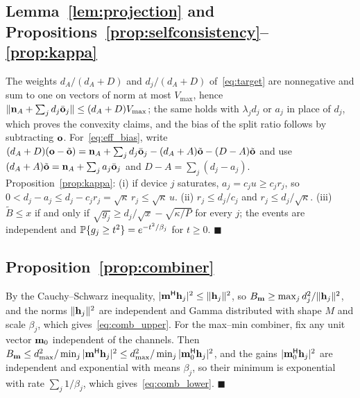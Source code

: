 \subsection{Lemma~\ref{lem:projection} and Propositions~\ref{prop:selfconsistency}--\ref{prop:kappa}}
The weights $d_A/(d_A+D)$ and $d_j/(d_A+D)$ of~\eqref{eq:target} are nonnegative and sum to one on vectors of norm at most $V_{\max}$, hence $\|\mathbf{n}_A+\sum_jd_j\bar{\mathbf{o}}_j\|\le(d_A+D)V_{\max}$; the same holds with $\lambda_jd_j$ or $a_j$ in place of $d_j$, which proves the convexity claims, and the bias of the split ratio follows by subtracting $\mathbf{o}$. For~\eqref{eq:eff_bias}, write $(d_A+D)(\mathbf{o}-\tilde{\mathbf{o}})=\mathbf{n}_A+\sum_jd_j\bar{\mathbf{o}}_j-(d_A+A)\tilde{\mathbf{o}}-(D-A)\tilde{\mathbf{o}}$ and use $(d_A+A)\tilde{\mathbf{o}}=\mathbf{n}_A+\sum_ja_j\bar{\mathbf{o}}_j$ and $D-A=\sum_j(d_j-a_j)$. Proposition~\ref{prop:kappa}: (i) if device $j$ saturates, $a_j=c_ju\ge c_jr_j$, so $0<d_j-a_j\le d_j-c_jr_j=\sqrt\kappa\,r_j\le\sqrt\kappa\,u$. (ii) $r_j\le d_j/c_j$ and $r_j\le d_j/\sqrt\kappa$. (iii) $\tilde B\le x$ if and only if $\sqrt{g_j}\ge d_j/\sqrt x-\sqrt{\kappa/P}$ for every $j$; the events are independent and $\mathbb{P}\{g_j\ge t^2\}=e^{-t^2/\beta_j}$ for $t\ge0$. \hfill$\blacksquare$

\subsection{Proposition~\ref{prop:combiner}}
By the Cauchy--Schwarz inequality, $|\mathbf{m}^{\mathsf H}\mathbf{h}_j|^2\le\|\mathbf{h}_j\|^2$, so $B_{\mathbf{m}}\ge\max_jd_j^2/\|\mathbf{h}_j\|^2$, and the norms $\|\mathbf{h}_j\|^2$ are independent and Gamma distributed with shape $M$ and scale $\beta_j$, which gives~\eqref{eq:comb_upper}. For the max--min combiner, fix any unit vector $\mathbf{m}_0$ independent of the channels. Then $B_{\mathbf{m}}\le d_{\max}^2/\min_j|\mathbf{m}^{\mathsf H}\mathbf{h}_j|^2\le d_{\max}^2/\min_j|\mathbf{m}_0^{\mathsf H}\mathbf{h}_j|^2$, and the gains $|\mathbf{m}_0^{\mathsf H}\mathbf{h}_j|^2$ are independent and exponential with means $\beta_j$, so their minimum is exponential with rate $\sum_j1/\beta_j$, which gives~\eqref{eq:comb_lower}. \hfill$\blacksquare$
